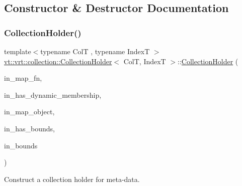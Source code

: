 \subsection{Constructor \& Destructor Documentation}
\mbox{\label{structvt_1_1vrt_1_1collection_1_1_collection_holder_a16fed674b4195fcf084c61dfe7921c7c}} 
\subsubsection{\texorpdfstring{Collection\+Holder()}{CollectionHolder()}}
{\footnotesize\ttfamily template$<$typename ColT , typename IndexT $>$ \\
\hyperlink{structvt_1_1vrt_1_1collection_1_1_collection_holder}{vt\+::vrt\+::collection\+::\+Collection\+Holder}$<$ ColT, IndexT $>$\+::\hyperlink{structvt_1_1vrt_1_1collection_1_1_collection_holder}{Collection\+Holder} (\begin{DoxyParamCaption}\item[{\hyperlink{namespacevt_af64846b57dfcaf104da3ef6967917573}{Handler\+Type} const}]{in\+\_\+map\+\_\+fn,  }\item[{bool const}]{in\+\_\+has\+\_\+dynamic\+\_\+membership,  }\item[{\hyperlink{namespacevt_ad7cae989df485fccca57f0792a880a8e}{Obj\+Group\+Proxy\+Type}}]{in\+\_\+map\+\_\+object,  }\item[{bool const}]{in\+\_\+has\+\_\+bounds,  }\item[{IndexT const}]{in\+\_\+bounds }\end{DoxyParamCaption})}



Construct a collection holder for meta-\/data. 


